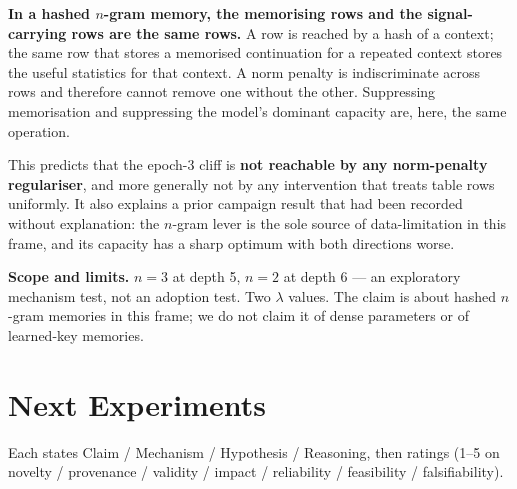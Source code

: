 \documentclass{article}
\begin{document}
\textbf{In a hashed $n$-gram memory, the memorising rows and the signal-carrying rows are the same rows.} A row is reached by a hash of a context; the same row that stores a memorised continuation for a repeated context stores the useful statistics for that context. A norm penalty is indiscriminate across rows and therefore cannot remove one without the other. Suppressing memorisation and suppressing the model's dominant capacity are, here, the same operation.

This predicts that the epoch-3 cliff is \textbf{not reachable by any norm-penalty regulariser}, and more generally not by any intervention that treats table rows uniformly. It also explains a prior campaign result that had been recorded without explanation: the $n$-gram lever is the sole source of data-limitation in this frame, and its capacity has a sharp optimum with both directions worse.

\textbf{Scope and limits.} $n{=}3$ at depth 5, $n{=}2$ at depth 6 --- an exploratory mechanism test, not an adoption test. Two $\lambda$ values. The claim is about hashed $n$-gram memories in this frame; we do not claim it of dense parameters or of learned-key memories.

\section{Next Experiments}
Each states Claim / Mechanism / Hypothesis / Reasoning, then ratings (1--5 on novelty / provenance / validity / impact / reliability / feasibility / falsifiability).
\end{document}
